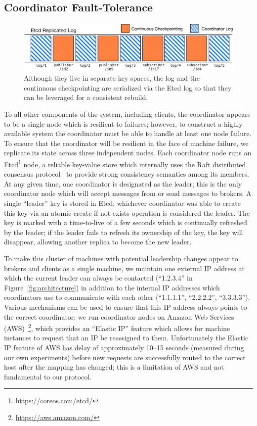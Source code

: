 \subsection{Coordinator Fault-Tolerance}
\label{subsec:coordinator_fault_tolerance}

\begin{figure}[t]
\centering
\includegraphics[width=.9\linewidth]{figs/logreplay.pdf}
\caption{Although they live in separate key spaces, the log and the continuous checkpointing are serialized via the Etcd log so that they can be leveraged for a consistent rebuild.}
\label{fig:logreplay}
\end{figure}

To all other components of the system, including clients, the coordinator appears to be a single node which is resilient to failures; however, to construct a highly available system the coordinator must be able to handle at least one node failure.
To ensure that the coordinator will be resilient in the face of machine failure, we replicate its state across three independent nodes.
Each coordinator node runs an Etcd\footnote{\url{https://coreos.com/etcd/}} node, a reliable key-value store which internally uses the Raft distributed consensus protocol~\cite{ongaro2014} to provide strong consistency semantics among its members.
At any given time, one coordinator is designated as the leader; this is the only coordinator node which will accept messages from or send messages to brokers.
A single ``leader'' key is stored in Etcd; whichever coordinator was able to create this key via an atomic create-if-not-exists operation is considered the leader.
The key is marked with a time-to-live of a few seconds which is continually refreshed by the leader; if the leader fails to refresh its ownership of the key, the key will disappear, allowing another replica to become the new leader.

To make this cluster of machines with potential leadership changes appear to brokers and clients as a single machine, we maintain one external IP address at which the current leader can always be contacted (``1.2.3.4'' in Figure~\ref{fig:architecture}) in addition to the internal IP addresses which coordinators use to communicate with each other (``1.1.1.1'', ``2.2.2.2'', ``3.3.3.3'').
Various mechanisms can be used to ensure that this IP address always points to the correct coordinator; we run coordinator nodes on Amazon Web Services (AWS)~\footnote{\url{https://aws.amazon.com/}}, which provides an ``Elastic IP'' feature which allows for machine instances to request that an IP be reassigned to them.
Unfortunately the Elastic IP feature of AWS has delay of approximately 10--15 seconds (measured during our own experiments) before new requests are successfully routed to the correct host after the mapping has changed; this is a limitation of AWS and not fundamental to our protocol.

